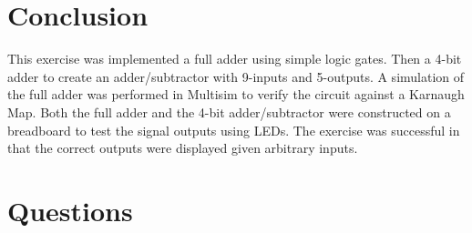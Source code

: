 \documentclass[CMPE]{KGCOEReport}
\begin{document}
\section*{Conclusion}

This exercise was implemented a full adder using simple logic gates. Then a 4-bit adder to create an adder/subtractor with 9-inputs and 5-outputs. A simulation of the full adder was performed in Multisim to verify the circuit against a Karnaugh Map. Both the full adder and the 4-bit adder/subtractor were constructed on a breadboard to test the signal outputs using LEDs. The exercise was successful in that the correct outputs were displayed given arbitrary inputs.




\section*{Questions}
\end{document}
